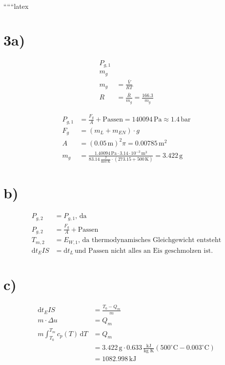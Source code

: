 
``````latex


\section*{3a)}

\begin{align*}
P_{g,1} & \\
m_g & \\
m_g & = \frac{\bar{V}}{R T} \\
R & = \frac{\bar{R}}{m_g} = \frac{166.3}{m_g}
\end{align*}

\begin{align*}
P_{g,1} & = \frac{F_g}{A} + \text{Passen} = 140094 \, \text{Pa} \approx 1.4 \, \text{bar} \\
F_g & = (m_L + m_{EN}) \cdot g \\
A & = (0.05 \, \text{m})^2 \pi = 0.00785 \, \text{m}^2 \\
m_g & = \frac{1.40094 \, \text{Pa} \cdot 3.14 \cdot 10^{-3} \, \text{m}^3}{83.14 \, \frac{\text{J}}{\text{mol K}} \cdot (273.15 + 500 \, \text{K})} = 3.422 \, \text{g}
\end{align*}

\section*{b)}

\begin{align*}
P_{g,2} & = P_{g,1}, \, \text{da} \\
P_{g,2} & = \frac{F_g}{A} + \text{Passen} \\
T_{m,2} & = E_{W,1}, \, \text{da thermodynamisches Gleichgewicht entsteht} \\
\text{d}t_EIS & = \text{d}t_L \, \text{und Passen nicht alles an Eis geschmolzen ist.}
\end{align*}

\section*{c)}

\begin{align*}
\text{d}t_EIS & = \frac{T_0 - Q_m}{m} \\
m \cdot \Delta u & = Q_m \\
m \int_{T_0}^{T_m} c_p(T) \, \text{d}T & = Q_m \\
& = 3.422 \, \text{g} \cdot 0.633 \, \frac{\text{kJ}}{\text{kg K}} (500^\circ \text{C} - 0.003^\circ \text{C}) \\
& = 1082.998 \, \text{kJ}
\end{align*}

